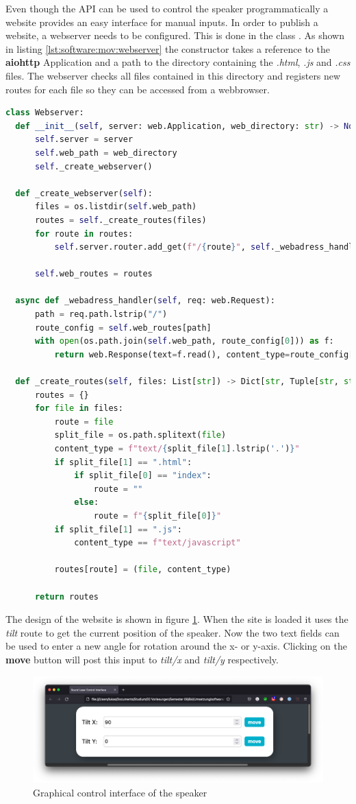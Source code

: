 Even though the API can be used to control the speaker programmatically a website provides an easy interface for manual inputs.\p
%
In order to publish a website, a webserver needs to be configured. This is done in the class . As shown in listing \ref{lst:software:mov:webserver} the constructor takes a reference to the \textbf{aiohttp} Application and a path to the directory containing the \textit{.html}, \textit{.js} and \textit{.css} files. The webserver checks all files contained in this directory and registers new routes for each file so they can be accessed from a webbrowser.
%
\begin{mdframed}
\begin{lstlisting}[language=Python, caption=Minimal python webserver, label=lst:software:mov:webserver]
class Webserver:
  def __init__(self, server: web.Application, web_directory: str) -> None:
      self.server = server
      self.web_path = web_directory
      self._create_webserver()

  def _create_webserver(self):
      files = os.listdir(self.web_path)
      routes = self._create_routes(files)
      for route in routes:
          self.server.router.add_get(f"/{route}", self._webadress_handler)

      self.web_routes = routes

  async def _webadress_handler(self, req: web.Request):
      path = req.path.lstrip("/")
      route_config = self.web_routes[path]
      with open(os.path.join(self.web_path, route_config[0])) as f:
          return web.Response(text=f.read(), content_type=route_config[1])

  def _create_routes(self, files: List[str]) -> Dict[str, Tuple[str, str]]:
      routes = {}
      for file in files:
          route = file
          split_file = os.path.splitext(file)
          content_type = f"text/{split_file[1].lstrip('.')}"
          if split_file[1] == ".html":
              if split_file[0] == "index":
                  route = ""
              else:
                  route = f"{split_file[0]}"
          if split_file[1] == ".js":
              content_type == f"text/javascript"

          routes[route] = (file, content_type)

      return routes
\end{lstlisting}
\end{mdframed}
%
\newpage\noindent
The design of the website is shown in figure \ref{fig:software:mov:website}. When the site is loaded it uses the \textit{tilt} route to get the current position of the speaker. Now the two text fields can be used to enter a new angle for rotation around the x- or y-axis. Clicking on the \textbf{move} button will post this input to \textit{tilt/x} and \textit{tilt/y} respectively.
%
\begin{figure}[ht]
  \centering
  \includegraphics[height=\smallheight]{src/assets/pictures/software/control_interface_xl.png}
  \caption{Graphical control interface of the speaker}\label{fig:software:mov:website}
\end{figure}